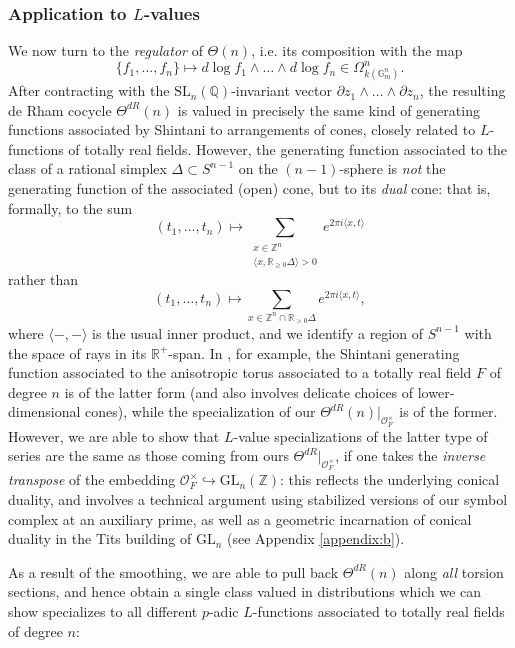 \documentclass[10pt]{amsart}
\theoremstyle{definition}
\newcommand{\Z}{\mathbb{Z}}
\newcommand{\Q}{\mathbb{Q}}
\newcommand{\R}{\mathbb{R}}
\newcommand{\G}{\mathbb{G}}
\newcommand{\SL}{\mathrm{SL}}
\newcommand{\GL}{\mathrm{GL}}
\numberwithin{equation}{section}
\begin{document}
    \subsubsection{Application to $L$-values}
    We now turn to the \emph{regulator} of $\Theta(n)$, i.e. its composition with the map
    \[
    \{f_1,\ldots, f_n\} \mapsto d\log f_1 \wedge \ldots \wedge d\log f_n \in \Omega^n_{k(\G_m^n)}.
    \]
    After contracting with the $\SL_n(\Q)$-invariant vector $\partial z_1 \wedge \ldots \wedge \partial z_n$, the resulting de Rham cocycle $\Theta^{dR}(n)$ is valued in precisely the same kind of generating functions associated by Shintani \cite{Shin} to arrangements of cones, closely related to $L$-functions of totally real fields. However, the generating function associated to the class of a rational simplex $\Delta\subset S^{n-1}$ on the $(n-1)$-sphere is \emph{not} the generating function of the associated (open) cone, but to its \emph{dual} cone: that is, formally, to the sum
    \[
    (t_1,\ldots, t_n)\mapsto \sum_{\substack{x\in \Z^n\\ \langle x,\R_{\ge 0}\Delta\rangle>0}} e^{2\pi i \langle x, t\rangle }
    \]
    rather than 
    \[
    (t_1,\ldots, t_n)\mapsto \sum_{x\in \Z^n\cap \R_{>0}\Delta} e^{2\pi i \langle x, t\rangle},
    \]
    where $\langle-,-\rangle$ is the usual inner product, and we identify a region of $S^{n-1}$ with the space of rays in its $\R^+$-span. In \cite{CDG}, for example, the Shintani generating function associated to the anisotropic torus associated to a totally real field $F$ of degree $n$ is of the latter form (and also involves delicate choices of lower-dimensional cones), while the specialization of our $\Theta^{dR}(n)|_{\mathcal{O}_F^\times}$ is of the former. However, we are able to show that $L$-value specializations of the latter type of series are the same as those coming from ours $\Theta^{dR}|_{\mathcal{O}_F^\times}$, if one takes the \emph{inverse transpose} of the embedding $\mathcal{O}_F^\times\hookrightarrow \GL_n(\Z)$: this reflects the underlying conical duality, and involves a technical argument using stabilized versions of our symbol complex at an auxiliary prime, as well as a geometric incarnation of conical duality in the Tits building of $\GL_n$ (see Appendix \ref{appendix:b}). 
    
    As a result of the smoothing, we are able to pull back $\Theta^{dR}(n)$ along \emph{all} torsion sections, and hence obtain a single class valued in distributions which we can show specializes to all different $p$-adic $L$-functions associated to totally real fields of degree $n$: 
\end{document}
